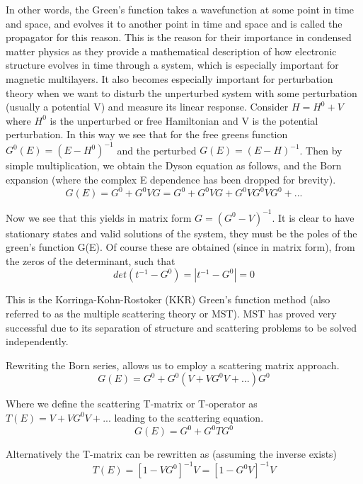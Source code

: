 \documentclass[12pt]{article}
\begin{document}
In other words, the Green's function takes a wavefunction at some point in time and space, and evolves it to another point in time and space and is called the propagator for this reason. This is the reason for their importance in condensed matter physics as they provide a mathematical description of how electronic structure evolves in time through a system, which is especially important for magnetic multilayers. It also becomes especially important for perturbation theory when we want to disturb the unperturbed system with some perturbation (usually a potential V) and measure its linear response. Consider $H=H^0+V$ where $H^0$ is the unperturbed or free Hamiltonian and V is the potential perturbation. In this way we see that for the free greens function $G^0(E)=(E-H^0)^{-1}$ and the perturbed $G(E)=(E-H)^{-1}$. Then by simple multiplication, we obtain the Dyson equation as follows, and the Born expansion (where the complex E dependence has been dropped for brevity).
\begin{equation} \label{4.1} \tag{4.4}
G(E)=G^0+G^0VG=G^0+G^0VG+G^0VG^0VG^0+...
\end{equation}

Now we see that this yields in matrix form $G=(G^0-V)^{-1}$. It is clear to have stationary states and valid solutions of the system, they must be the poles of the green's function G(E). Of course these are obtained (since in matrix form), from the zeros of the determinant, such that
\begin{equation} \label{4.1} \tag{4.5}
det(t^{-1}-G^0)=|t^{-1}-G^0|=0
\end{equation}

This is the Korringa-Kohn-Rostoker (KKR) Green's function method (also referred to as the multiple scattering theory or MST). MST has proved very successful due to its separation of structure and scattering problems to be solved independently. 

Rewriting the Born series, allows us to employ a scattering matrix approach. 
\begin{equation} \label{4.1} \tag{4.6}
G(E)=G^0+G^0(V+VG^0V+...)G^0
\end{equation}

Where we define the scattering T-matrix or T-operator as $T(E)= V+VG^0V+...$ leading to the scattering equation.
\begin{equation} \label{4.1} \tag{4.7}
G(E)=G^0+G^0TG^0
\end{equation}

Alternatively the T-matrix can be rewritten as (assuming the inverse exists) 
\begin{equation} \label{4.1} \tag{4.8}
T(E)=[1-VG^0]^{-1}V=[1-G^0V]^{-1}V
\end{equation}
\end{document}
